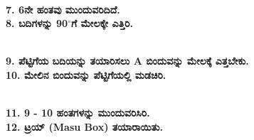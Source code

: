 \begin{figure}[H]
\\
\textbf{7. 6ನೇ ಹಂತವು ಮುಂದುವರಿದಿದೆ.}\\
\textbf{8. ಬದಿಗಳನ್ನು 90$^{\circ}$ಗೆ ಮೇಲಕ್ಕೇ ಎತ್ತಿರಿ.}
\end{figure}
\begin{figure}[H]
\\
\textbf{9. ಪೆಟ್ಟಿಗೆಯ ಬದಿಯನ್ನು ತಯಾರಿಸಲು A ಬಿಂದುವನ್ನು ಮೇಲಕ್ಕೆ ಎತ್ತಬೇಕು.}\\
\textbf{10. ಮೇಲಿನ ಬಿಂದುವನ್ನು ಪೆಟ್ಟಿಗೆಯಲ್ಲಿ ಮಡಚಿರಿ.}
\end{figure}
\begin{figure}[H]
\\
\textbf{11. 9 - 10 ಹಂತಗಳನ್ನು ಮುಂದುವರಿಸಿರಿ.}\\
\textbf{12. ಟ್ರಯ್ (Masu Box) ತಯಾರಾಯಿತು.}
\end{figure}

